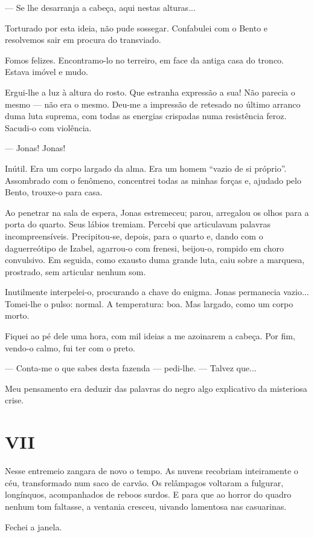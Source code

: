 --- Se lhe desarranja a cabeça, aqui nestas alturas...

Torturado por esta ideia, não pude sossegar. Confabulei com o Bento e
resolvemos sair em procura do transviado.

Fomos felizes. Encontramo-lo no terreiro, em face da antiga casa do
tronco. Estava imóvel e mudo.

Ergui-lhe a luz à altura do rosto. Que estranha expressão a sua! Não
parecia o mesmo --- não era o mesmo. Deu-me a impressão de retesado no
último arranco duma luta suprema, com todas as energias crispadas numa
resistência feroz. Sacudi-o com violência.

--- Jonas! Jonas!

Inútil. Era um corpo largado da alma. Era um homem ``vazio de si
próprio''. Assombrado com o fenômeno, concentrei todas as minhas forças
e, ajudado pelo Bento, trouxe-o para casa.

Ao penetrar na sala de espera, Jonas estremeceu; parou, arregalou os
olhos para a porta do quarto. Seus lábios tremiam. Percebi que
articulavam palavras incompreensíveis. Precipitou-se, depois, para o
quarto e, dando com o daguerreótipo de Izabel, agarrou-o com frenesi,
beijou-o, rompido em choro convulsivo. Em seguida, como exausto duma
grande luta, caiu sobre a marquesa, prostrado, sem articular nenhum som.

Inutilmente interpelei-o, procurando a chave do enigma. Jonas permanecia
vazio... Tomei-lhe o pulso: normal. A temperatura: boa. Mas largado,
como um corpo morto.

Fiquei ao pé dele uma hora, com mil ideias a me azoinarem a cabeça. Por
fim, vendo-o calmo, fui ter com o preto.

--- Conta-me o que sabes desta fazenda --- pedi-lhe. --- Talvez que...

Meu pensamento era deduzir das palavras do negro algo explicativo da
misteriosa crise.

\section{VII}

Nesse entremeio zangara de novo o tempo. As nuvens recobriam
inteiramente o céu, transformado num saco de carvão. Os relâmpagos
voltaram a fulgurar, longínquos, acompanhados de reboos surdos. E para
que ao horror do quadro nenhum tom faltasse, a ventania cresceu, uivando
lamentosa nas casuarinas.

Fechei a janela.

